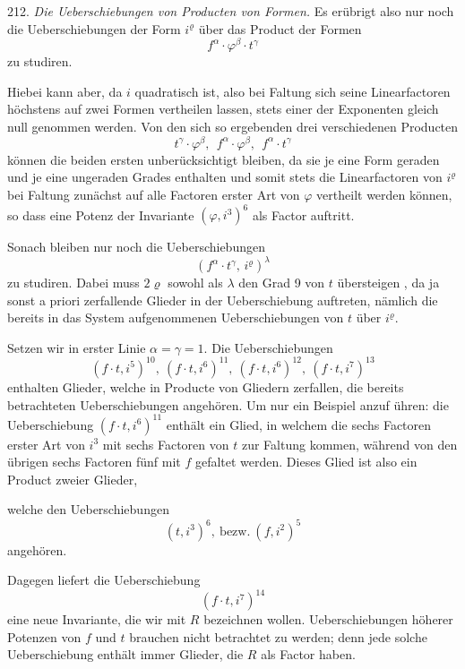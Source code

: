 \documentclass[11pt]{article}
\providecommand{\weberpage}[1]{}
\begin{document}
212. \textit{Die Ueberschiebungen von Producten von Formen.} Es er\"ubrigt
also nur noch die Ueberschiebungen der Form $i^\varrho$ \"uber das Product
der Formen
\[
f^\alpha \cdot \varphi^\beta \cdot t^\gamma
\]
zu studiren.

Hiebei kann aber, da $i$ quadratisch ist, also bei Faltung sich
seine Linearfactoren h\"ochstens auf zwei Formen vertheilen lassen,
stets einer der Exponenten gleich null genommen werden. Von den
sich so ergebenden drei verschiedenen Producten
\[
t^\gamma \cdot \varphi^\beta,\ \ f^\alpha \cdot \varphi^\beta,\ \ f^\alpha \cdot t^\gamma
\]
k\"onnen die beiden ersten unber\"ucksichtigt bleiben, da sie je eine Form
geraden und je eine ungeraden Grades enthalten und somit stets die
Linearfactoren von $i^\varrho$ bei Faltung zun\"achst auf alle Factoren erster
Art von $\varphi$ vertheilt werden k\"onnen, so dass eine Potenz der Invariante
$(\varphi, i^3)^6$ als Factor auftritt.

Sonach bleiben nur noch die Ueberschiebungen
\[
(f^\alpha \cdot t^\gamma,\, i^\varrho)^\lambda
\]
zu studiren. Dabei muss $2\varrho$ sowohl als $\lambda$ den Grad 9 von $t$ \"ubersteigen
, da ja sonst a priori zerfallende Glieder in der Ueberschiebung
auftreten, n\"amlich die bereits in das System aufgenommenen Ueberschiebungen
 von $t$ \"uber $i^\varrho$.

Setzen wir in erster Linie $\alpha = \gamma = 1$. Die Ueberschiebungen
\[
(f \cdot t, i^5)^{10},\ (f \cdot t, i^6)^{11},\ (f \cdot t, i^6)^{12},\ (f \cdot t, i^7)^{13}
\]
enthalten Glieder, welche in Producte von Gliedern zerfallen, die bereits
betrachteten Ueberschiebungen angeh\"oren. Um nur ein Beispiel anzuf
\"uhren: die Ueberschiebung $(f \cdot t, i^6)^{11}$ enth\"alt ein Glied, in welchem
die sechs Factoren erster Art von $i^3$ mit sechs Factoren von $t$ zur
Faltung kommen, w\"ahrend von den \"ubrigen sechs Factoren f\"unf mit
$f$ gefaltet werden. Dieses Glied ist also ein Product zweier Glieder,


\weberpage{240}
welche den Ueberschiebungen
\[
(t, i^3)^6,\ \text{bezw.}\ (f, i^2)^5
\]
angeh\"oren.

Dagegen liefert die Ueberschiebung
\[
(f \cdot t, i^7)^{14}
\]
eine neue Invariante, die wir mit $R$ bezeichnen wollen. Ueberschiebungen
 h\"oherer Potenzen von $f$ und $t$ brauchen nicht betrachtet
zu werden; denn jede solche Ueberschiebung enth\"alt immer Glieder,
die $R$ als Factor haben.
\end{document}
